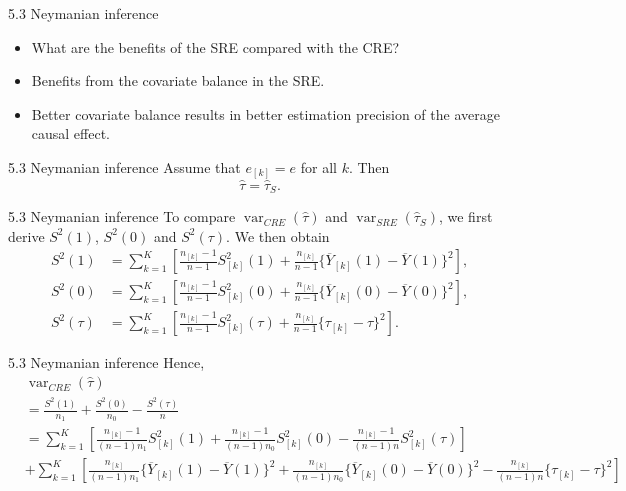 \documentclass[aspectratio=169, 12pt]{beamer}
\begin{document}
\begin{frame}{5.3 Neymanian inference}
  \begin{itemize}
    \item What are the benefits of the SRE compared with the CRE?
    \item Benefits from the covariate balance in the SRE.
    \item Better covariate balance results in better estimation precision of the average causal effect. 
  \end{itemize}
\end{frame}

\begin{frame}[label=neymanian]{5.3 Neymanian inference}
  Assume that $e_{[k]} = e$ for all $k$. Then
  \begin{equation}
    \widehat{\tau} = \widehat{\tau}_S.
    \label{eq:neymanian_inf}
  \end{equation}
  \vfill
  \hfill\hyperlink{pf-neymanian<1>}{}
\end{frame}

\begin{frame}[label=variances]{5.3 Neymanian inference}
  To compare $\operatorname{var}_{CRE}(\widehat{\tau})$ and $\operatorname{var}_{SRE}(\widehat{\tau}_S)$, we first derive $S^2(1)$, $S^2(0)$ and $S^2(\tau)$. We then obtain
  \[
  \begin{aligned}
    S^2(1)
    &=\sum_{k=1}^{K}\left[
      \frac{n_{[k]}-1}{n-1}S_{[k]}^2(1)+\frac{n_{[k]}}{n-1}\{\overline{Y}_{[k]}(1)-\overline{Y}(1)\}^2
    \right],\\
    S^2(0)
    &=\sum_{k=1}^{K}\left[
      \frac{n_{[k]}-1}{n-1}S_{[k]}^2(0)+\frac{n_{[k]}}{n-1}\{\overline{Y}_{[k]}(0)-\overline{Y}(0)\}^2
    \right],\\
    S^2(\tau)
    &= \sum_{k=1}^{K}\left[
      \frac{n_{[k]}-1}{n-1}S_{[k]}^2(\tau) + \frac{n_{[k]}}{n-1}\{\tau_{[k]}-\tau\}^2
    \right].
  \end{aligned}
  \]
  \vfill
  \hfill\hyperlink{pf-variances<1>}{}
\end{frame}

\begin{frame}{5.3 Neymanian inference}
  Hence,
  {\small
  \begin{align*}
    &\operatorname{var}_{CRE}(\widehat{\tau})\\
    &= \frac{S^2(1)}{n_1} + \frac{S^2(0)}{n_0} - \frac{S^2(\tau)}{n}\\
    &= \sum_{k=1}^{K}\left[
      \frac{n_{[k]}-1}{(n-1)n_1}S_{[k]}^2(1) + \frac{n_{[k]}-1}{(n-1)n_0}S_{[k]}^2(0) - \frac{n_{[k]}-1}{(n-1)n}S_{[k]}^2(\tau)
    \right]\\
    &+ \sum_{k=1}^{K}\left[
      \frac{n_{[k]}}{(n-1)n_1}\{\overline{Y}_{[k]}(1)-\overline{Y}(1)\}^2 + \frac{n_{[k]}}{(n-1)n_0}\{\overline{Y}_{[k]}(0)-\overline{Y}(0)\}^2 - \frac{n_{[k]}}{(n-1)n}\{\tau_{[k]}-\tau\}^2
    \right]
  \end{align*}}
\end{frame}
\end{document}
